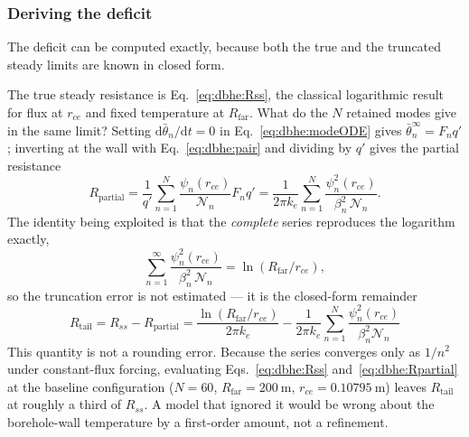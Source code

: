 \subsubsection{Deriving the deficit}
The deficit can be computed exactly, because both the true and the truncated
steady limits are known in closed form.

The true steady resistance is Eq.~\eqref{eq:dbhe:Rss}, the classical logarithmic
result for flux at $r_{ce}$ and fixed temperature at $R_{\mathrm{far}}$. What do
the $N$ retained modes give in the same limit? Setting
$\mathrm{d}\bar\theta_n/\mathrm{d}t=0$ in Eq.~\eqref{eq:dbhe:modeODE} gives
$\bar\theta_n^{\infty}=F_n q'$; inverting at the wall with
Eq.~\eqref{eq:dbhe:pair} and dividing by $q'$ gives the partial resistance
\begin{equation}
R_{\mathrm{partial}} =\frac{1}{q'}\sum_{n=1}^{N}\frac{\psi_n(r_{ce})}{\mathcal{N}_n}F_n q'
=\frac{1}{2\pi k_e}\sum_{n=1}^{N} \frac{\psi_n^{2}(r_{ce})}{\beta_n^{2}\,\mathcal{N}_n} .
\label{eq:dbhe:Rpartial}
\end{equation}
The identity being exploited is that the \emph{complete} series reproduces the
logarithm exactly,
\begin{equation}
\sum_{n=1}^{\infty}\frac{\psi_n^{2}(r_{ce})}{\beta_n^{2}\,\mathcal{N}_n}
=\ln\!\left(R_{\mathrm{far}}/r_{ce}\right),
\label{eq:dbhe:sumid}
\end{equation}
so the truncation error is not estimated --- it is the closed-form remainder
\begin{equation}
\boxed{\; R_{\mathrm{tail}}=R_{ss}-R_{\mathrm{partial}}
=\frac{\ln(R_{\mathrm{far}}/r_{ce})}{2\pi k_e} -\frac{1}{2\pi
k_e}\sum_{n=1}^{N}\frac{\psi_n^{2}(r_{ce})}{\beta_n^{2}\mathcal{N}_n}\;}
\label{eq:dbhe:Rtail}
\end{equation}
This quantity is not a rounding error. Because the series converges only as
$1/n^{2}$ under constant-flux forcing, evaluating
Eqs.~\eqref{eq:dbhe:Rss} and~\eqref{eq:dbhe:Rpartial} at the baseline
configuration ($N=60$, $R_{\mathrm{far}}=\SI{200}{\metre}$,
$r_{ce}=\SI{0.10795}{\metre}$) leaves $R_{\mathrm{tail}}$ at roughly a third of
$R_{ss}$. A model that ignored it would be wrong about the borehole-wall
temperature by a first-order amount, not a refinement.

